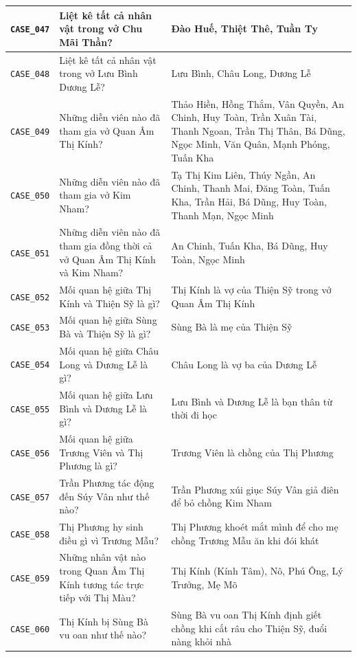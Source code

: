 \begin{longtable}{|p{1.9cm}|p{5.2cm}|p{7.3cm}|}
  \hline
  \texttt{CASE\_047} & Liệt kê tất cả nhân vật trong vở Chu Mãi Thần? & Đào Huế, Thiệt Thê, Tuần Ty \\
  \hline
  \texttt{CASE\_048} & Liệt kê tất cả nhân vật trong vở Lưu Bình Dương Lễ? & Lưu Bình, Châu Long, Dương Lễ \\
  \hline
  \texttt{CASE\_049} & Những diễn viên nào đã tham gia vở Quan Âm Thị Kính? & Thảo Hiền, Hồng Thắm, Vân Quyền, An Chinh, Huy Toàn, Trần Xuân Tài, Thanh Ngoan, Trần Thị Thân, Bá Dũng, Ngọc Minh, Văn Quân, Mạnh Phóng, Tuấn Kha \\
  \hline
  \texttt{CASE\_050} & Những diễn viên nào đã tham gia vở Kim Nham? & Tạ Thị Kim Liên, Thúy Ngần, An Chinh, Thanh Mai, Đăng Toàn, Tuấn Kha, Trần Hải, Bá Dũng, Huy Toàn, Thanh Mạn, Ngọc Minh \\
  \hline
  \texttt{CASE\_051} & Những diễn viên nào đã tham gia đồng thời cả vở Quan Âm Thị Kính và Kim Nham? & An Chinh, Tuấn Kha, Bá Dũng, Huy Toàn, Ngọc Minh \\
  \hline
  \texttt{CASE\_052} & Mối quan hệ giữa Thị Kính và Thiện Sỹ là gì? & Thị Kính là vợ của Thiện Sỹ trong vở Quan Âm Thị Kính \\
  \hline
  \texttt{CASE\_053} & Mối quan hệ giữa Sùng Bà và Thiện Sỹ là gì? & Sùng Bà là mẹ của Thiện Sỹ \\
  \hline
  \texttt{CASE\_054} & Mối quan hệ giữa Châu Long và Dương Lễ là gì? & Châu Long là vợ ba của Dương Lễ \\
  \hline
  \texttt{CASE\_055} & Mối quan hệ giữa Lưu Bình và Dương Lễ là gì? & Lưu Bình và Dương Lễ là bạn thân từ thời đi học \\
  \hline
  \texttt{CASE\_056} & Mối quan hệ giữa Trương Viên và Thị Phương là gì? & Trương Viên là chồng của Thị Phương \\
  \hline
  \texttt{CASE\_057} & Trần Phương tác động đến Súy Vân như thế nào? & Trần Phương xúi giục Súy Vân giả điên để bỏ chồng Kim Nham \\
  \hline
  \texttt{CASE\_058} & Thị Phương hy sinh điều gì vì Trương Mẫu? & Thị Phương khoét mắt mình để cho mẹ chồng Trương Mẫu ăn khi đói khát \\
  \hline
  \texttt{CASE\_059} & Những nhân vật nào trong Quan Âm Thị Kính tương tác trực tiếp với Thị Màu? & Thị Kính (Kính Tâm), Nô, Phú Ông, Lý Trưởng, Mẹ Mõ \\
  \hline
  \texttt{CASE\_060} & Thị Kính bị Sùng Bà vu oan như thế nào? & Sùng Bà vu oan Thị Kính định giết chồng khi cắt râu cho Thiện Sỹ, đuổi nàng khỏi nhà \\

\end{longtable}
